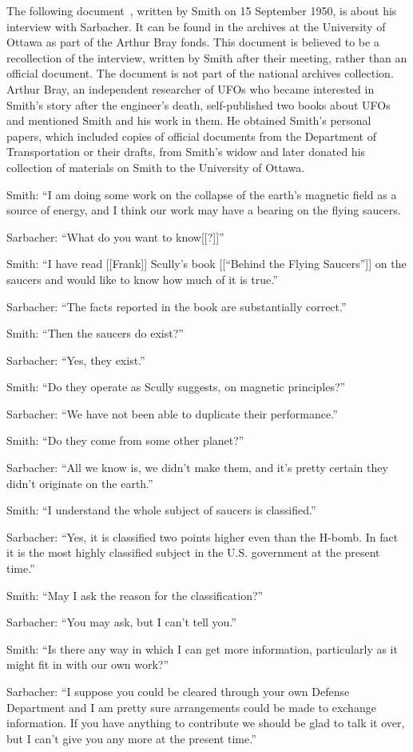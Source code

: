 The following document~\cite{SmithWilbertNotes}, written by Smith on 15 September 1950, is about his interview with Sarbacher. It can be found in the archives at the University of Ottawa as part of the Arthur Bray fonds. This document is believed to be a recollection of the interview, written by Smith after their meeting, rather than an official document. The document is not part of the national archives collection. Arthur Bray, an independent researcher of UFOs who became interested in Smith's story after the engineer's death, self-published two books about UFOs and mentioned Smith and his work in them. He obtained Smith's personal papers, which included copies of official documents from the Department of Transportation or their drafts, from Smith's widow and later donated his collection of materials on Smith to the University of Ottawa.

\begin{svgraybox}
\noindent  Smith: ``I am doing some work on the collapse of the earth's magnetic field as a source of energy, and I think our work may have a bearing on the flying saucers.

\noindent  Sarbacher: ``What do you want to know[[?]]''

\noindent  Smith: ``I have read [[Frank]] Scully's book [[``Behind the Flying Saucers'']]
on the saucers and would like to know how much of it is true.''

\noindent  Sarbacher: ``The facts reported in the book are substantially correct.''

\noindent  Smith: ``Then the saucers do exist?''

\noindent  Sarbacher: ``Yes, they exist.''

\noindent  Smith: ``Do they operate as Scully suggests, on magnetic principles?''

\noindent  Sarbacher: ``We have not been able to duplicate their performance.''

\noindent  Smith: ``Do they come from some other planet?''

\noindent  Sarbacher: ``All we know is, we didn't make them, and it's pretty certain they didn't originate on the earth.''

\noindent  Smith: ``I understand the whole subject of saucers is classified.''

\noindent  Sarbacher: ``Yes, it is classified two points higher even than the H-bomb.
In fact it is the most highly classified subject in the U.S. government at the present time.''

\noindent  Smith: ``May I ask the reason for the classification?''

\noindent  Sarbacher: ``You may ask, but I can't tell you.''

\noindent  Smith: ``Is there any way in which I can get more information, particularly as it might fit in with our own work?''

\noindent  Sarbacher: ``I suppose you could be cleared through your own Defense Department and
I am pretty sure arrangements could be made to exchange information. If you have anything to contribute we should be glad to talk it over,
but I can't give you any more at the present time.''
\end{svgraybox}

